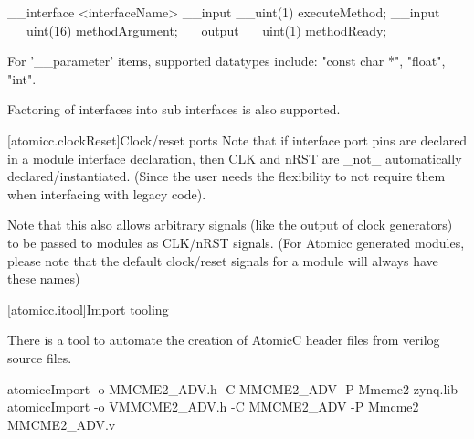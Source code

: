 \begin{example}
\begin{codeblock}
     __interface <interfaceName> {
          __input __uint(1) executeMethod;
          __input __uint(16) methodArgument;
          __output __uint(1) methodReady;
     }
\end{codeblock}
\end{example}

For '__parameter' items, supported datatypes include: "const char *", "float", "int".

Factoring of interfaces into sub interfaces is also supported.

[atomicc.clockReset]{Clock/reset ports}
Note that if interface port pins are declared in a module interface declaration, then
CLK and nRST are _not_ automatically declared/instantiated.  (Since the user needs the
flexibility to not require them when interfacing with legacy code).

Note that this also allows arbitrary signals (like the output of clock generators) to be
passed to modules as CLK/nRST signals.  (For Atomicc generated modules, please note that the
default clock/reset signals for a module will always have these names)

[atomicc.itool]{Import tooling}

There is a tool to automate the creation of AtomicC header files from verilog source files.
\begin{example}
\begin{codeblock}
     atomiccImport -o MMCME2_ADV.h -C MMCME2_ADV -P Mmcme2 zynq.lib
     atomiccImport -o VMMCME2_ADV.h -C MMCME2_ADV -P Mmcme2 MMCME2_ADV.v
\end{codeblock}
\end{example}
